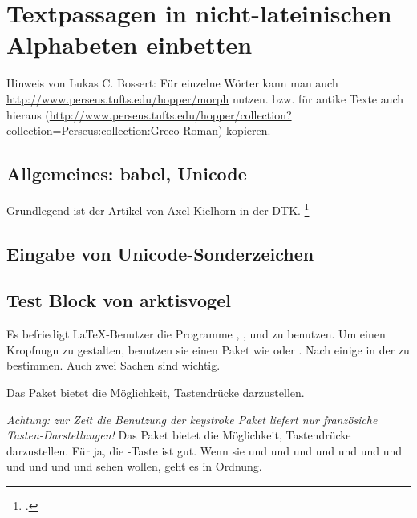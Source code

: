 \chapter{Textpassagen in nicht-lateinischen Alphabeten einbetten}

Hinweis von Lukas C. Bossert:
Für einzelne Wörter kann man auch \url{http://www.perseus.tufts.edu/hopper/morph} nutzen.
bzw. für antike Texte auch hieraus (\url{http://www.perseus.tufts.edu/hopper/collection?collection=Perseus:collection:Greco-Roman}) kopieren.

\section{Allgemeines: babel, Unicode}

Grundlegend ist der Artikel von Axel Kielhorn in der DTK.%
\footcite{kielhorn:dtk2014}

\section{Eingabe von Unicode-Sonderzeichen}
\label{unicodeeingabe}

\label{unicodeviaemacs}

\section{Test Block von arktisvogel}

\label{cpftestalpha}

Es befriedigt \LaTeX{}-Benutzer die Programme \LuaLaTeX ,
\METAFONT{}, \pdfLaTeX{} und \XeLaTeX{} zu benutzen. Um einen
Kropfnugn zu gestalten, benutzen sie einen Paket wie
 oder .
Nach einige  in der
 zu bestimmen. Auch zwei
 Sachen sind
 wichtig.

\label{cpftestbety}

Das Paket  bietet die Möglichkeit,
Tastendrücke darzustellen.


\textit{Achtung: zur Zeit die Benutzung der keystroke Paket
liefert nur französiche Tasten-Darstellungen!}\/ Das
Paket  bietet die Möglichkeit,
Tastendrücke darzustellen. Für ja,
die \hbox{-Taste} ist gut. Wenn sie \Del{} und %
\Ins{}%
und %
\Esc{}%
und %
\Shift{}%
und %
\Ctrl{}%
und %
\Home{}%
und %
\End{}%
und %
\PgUp{}%
und %
\PgDown{}%
und %
\PrtScroll{}%
und %
\Spacebar{}%
und %
\Break{} sehen wollen, geht es in Ordnung.

